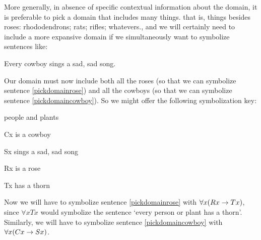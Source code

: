 %

More generally, in absence of specific contextual information about the domain, it is preferable to pick a domain that includes many things. that is, things besides roses: rhododendrons; rats; rifles; whatevers., and we will certainly need to include a more expansive domain if we simultaneously want to symbolize sentences like:
	\begin{earg}
		\item[\ex{pickdomaincowboy}] Every cowboy sings a sad, sad song.
	\end{earg}
Our domain must now include both all the roses (so that we can symbolize sentence \ref{pickdomainrose}) and all the cowboys (so that we can symbolize sentence \ref{pickdomaincowboy}). So we might offer the following symbolization key:
	\begin{ekey}
		\item[\text{domain}] people and plants
		\item[Cx]  is a cowboy
		\item[Sx]  sings a sad, sad song
		\item[Rx]  is a rose
		\item[Tx]  has a thorn
	\end{ekey}
Now we will have to symbolize sentence \ref{pickdomainrose} with $\forall x (Rx \rightarrow Tx)$, since $\forall x Tx$ would symbolize the sentence `every person or plant has a thorn'. Similarly, we will have to symbolize sentence \ref{pickdomaincowboy} with $\forall x (Cx \rightarrow Sx)$.

